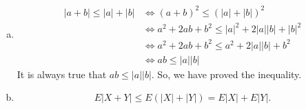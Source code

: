 \documentclass[14pt]{elegantbook}
\begin{document}
    \begin{solution}
        \begin{enumerate}[(a)]
            \item \begin{align*}
                |a+b|\leq|a|+|b|&\Longleftrightarrow(a+b)^2\leq(|a|+|b|)^2\\
                &\Longleftrightarrow a^2+2ab+b^2\leq|a|^2+2|a||b|+|b|^2\\
                &\Longleftrightarrow a^2+2ab+b^2\leq a^2+2|a||b|+b^2\\
                &\Longleftrightarrow ab\leq|a||b|
            \end{align*}
            It is always true that $ab\leq|a||b|$. So, we have proved the inequality. 
            \item \[E|X+Y|\leq E(|X|+|Y|)= E|X|+E|Y|. \]
        \end{enumerate}
    \end{solution}
\end{document}
